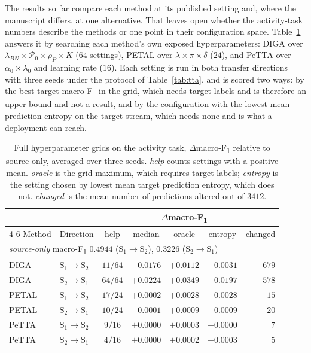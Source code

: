 \documentclass[a4paper,fleqn]{cas-dc}
\newcommand{\macf}{macro-F\textsubscript{1}}
\begin{document}
The results so far compare each method at its published setting and, where the manuscript
differs, at one alternative. That leaves open whether the activity-task numbers describe
the methods or one point in their configuration space. Table~\ref{tab:hgrid} answers it by
searching each method's own exposed hyperparameters: DIGA over
$\lambda_{BN}\times\mathcal{P}_0\times\rho_P\times K$ ($64$ settings), PETAL over
$\bar\lambda\times\pi\times\delta$ ($24$), and PeTTA over $\alpha_0\times\lambda_0$ and
learning rate ($16$). Each setting is run in both transfer directions with three seeds
under the protocol of Table~\ref{tab:tta}, and is scored two ways: by the best target
\macf{} in the grid, which needs target labels and is therefore an upper bound and not
a result, and by the configuration with the lowest mean prediction entropy on the target
stream, which needs none and is what a deployment can reach.

\begin{table}[t]
\centering
\caption{Full hyperparameter grids on the activity task, $\Delta$\macf{} relative to
source-only, averaged over three seeds. \emph{help} counts settings with a positive mean.
\emph{oracle} is the grid maximum, which requires target labels; \emph{entropy} is the
setting chosen by lowest mean target prediction entropy, which does not. \emph{changed} is
the mean number of predictions altered out of $3412$.}
\label{tab:hgrid}
\small
\begin{tabular}{llccccr}
\toprule
 & & & \multicolumn{3}{c}{$\Delta$\macf} & \\
\cmidrule(lr){4-6}
Method & Direction & help & median & oracle & entropy & changed \\
\midrule
\multicolumn{7}{l}{\emph{source-only} \macf{} $0.4944$ ($\text{S}_1\!\to\!\text{S}_2$), $0.3226$ ($\text{S}_2\!\to\!\text{S}_1$)} \\
\addlinespace[2pt]
DIGA  & $\text{S}_1\!\to\!\text{S}_2$ & $11/64$ & $-0.0176$ & $+0.0112$ & $+0.0031$ & $679$ \\
DIGA  & $\text{S}_2\!\to\!\text{S}_1$ & $64/64$ & $+0.0224$ & $+0.0349$ & $+0.0197$ & $578$ \\
PETAL & $\text{S}_1\!\to\!\text{S}_2$ & $17/24$ & $+0.0002$ & $+0.0028$ & $+0.0028$ & $15$ \\
PETAL & $\text{S}_2\!\to\!\text{S}_1$ & $10/24$ & $-0.0001$ & $+0.0009$ & $-0.0009$ & $20$ \\
PeTTA & $\text{S}_1\!\to\!\text{S}_2$ & $9/16$  & $+0.0000$ & $+0.0003$ & $+0.0000$ & $7$ \\
PeTTA & $\text{S}_2\!\to\!\text{S}_1$ & $4/16$  & $+0.0000$ & $+0.0002$ & $-0.0003$ & $5$ \\
\bottomrule
\end{tabular}
\end{table}
\end{document}
